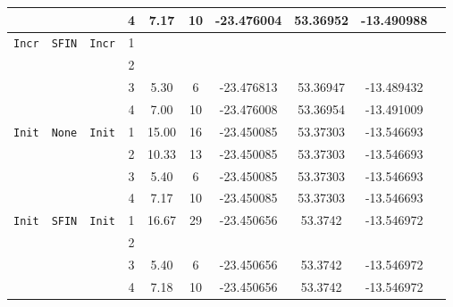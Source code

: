\begin{center}
\begin{table}
\begin{tabular*}{\textwidth}{@{\extracolsep\fill}cccccccccc@{}}
                &               &                & 4 &       7.17   & 10 &  -23.476004 &  53.36952 &  -13.490988  & \\
  \hline                                                                                           
  \texttt{Incr} & \texttt{SFIN} & \texttt{Incr}  & 1 \\                                            
                &               &                & 2 \\                                            
                &               &                & 3 &       5.30   &  6 &  -23.476813 &  53.36947 &  -13.489432  \\
                &               &                & 4 &       7.00   & 10 &  -23.476008 &  53.36954 &  -13.491009  \\
  \hline                                                                                           
  \texttt{Init} & \texttt{None} & \texttt{Init}  & 1 &      15.00   & 16 &  -23.450085 &  53.37303 &  -13.546693  \\ %
                &               &                & 2 &      10.33   & 13 &  -23.450085 &  53.37303 &  -13.546693  \\
                &               &                & 3 &       5.40   &  6 &  -23.450085 &  53.37303 &  -13.546693  \\ %
                &               &                & 4 &       7.17   & 10 &  -23.450085 &  53.37303 &  -13.546693  & \cite{mikdad1995interpolation} \\ %
  \hline                                                                                           
  \texttt{Init} & \texttt{SFIN} & \texttt{Init}  & 1 &      16.67   & 29 &  -23.450656 &  53.3742  &  -13.546972  \\
                &               &                & 2 \\                                            
                &               &                & 3 &       5.40   &  6 &  -23.450656 &  53.3742  &  -13.546972  \\
                &               &                & 4 &       7.18   & 10 &  -23.450656 &  53.3742  &  -13.546972  \\
\bottomrule
\end{tabular*}
\end{table}
\end{center}
